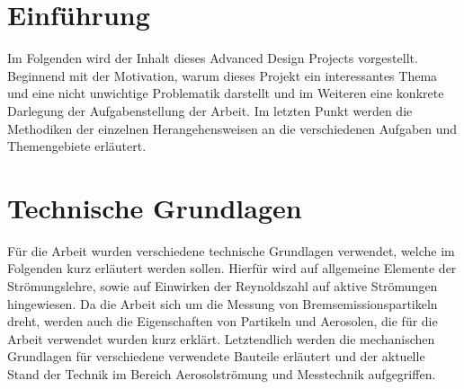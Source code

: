 \chapter{Einf\"{u}hrung}\label{ch:introduction}
Im Folgenden wird der Inhalt dieses Advanced Design Projects vorgestellt. Beginnend mit der Motivation, warum dieses Projekt ein interessantes Thema und eine nicht unwichtige Problematik darstellt und im Weiteren eine konkrete Darlegung der Aufgabenstellung der Arbeit. Im letzten Punkt werden die Methodiken der einzelnen Herangehensweisen an die verschiedenen Aufgaben und Themengebiete erl\"{a}utert. 







\chapter{Technische Grundlagen}\label{ch:foundations}
F\"{u}r die Arbeit wurden verschiedene technische Grundlagen verwendet, welche im Folgenden kurz erl\"{a}utert werden sollen. Hierf\"{u}r wird auf allgemeine Elemente der Str\"{o}mungslehre, sowie auf Einwirken der Reynoldszahl auf aktive Str\"{o}mungen hingewiesen. Da die Arbeit sich um die Messung von Bremsemissionspartikeln dreht, werden auch die Eigenschaften von Partikeln und Aerosolen, die f\"{u}r die Arbeit verwendet wurden kurz erkl\"{a}rt. Letztendlich werden die mechanischen Grundlagen f\"{u}r verschiedene verwendete Bauteile erl\"{a}utert und der aktuelle Stand der Technik im Bereich Aerosolstr\"{o}mung und Messtechnik aufgegriffen.







